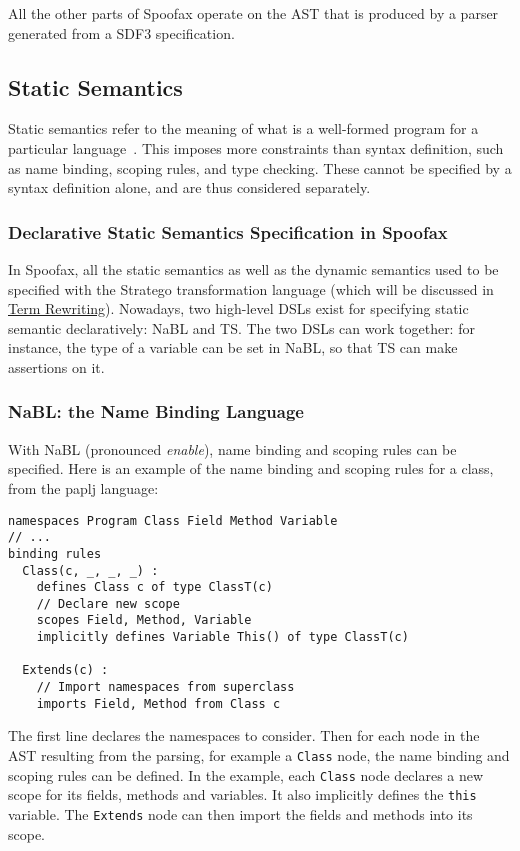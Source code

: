 All the other parts of Spoofax operate on the AST that is produced by
a parser generated from a SDF3 specification.
\subsection{Static Semantics}
\label{sec-static-analysis}
Static semantics refer to the meaning of what is a well-formed program
for a particular language~\cite{Milner97}. This imposes more
constraints than syntax definition, such as name binding, scoping
rules, and type checking. These cannot be specified by a syntax
definition alone, and are thus considered separately.
\subsubsection{Declarative Static Semantics Specification in Spoofax}
\label{sec:orgheadline1}
In Spoofax, all the static semantics as well as the dynamic semantics
used to be specified with the Stratego transformation language (which
will be discussed in \hyperref[sec-term-rewrite]{Term Rewriting}). Nowadays, two high-level DSLs
exist for specifying static semantic declaratively: NaBL and TS. The
two DSLs can work together: for instance, the type of a variable can
be set in NaBL, so that TS can make assertions on it.
\subsubsection{NaBL: the Name Binding Language}
\label{sec:orgheadline2}
With NaBL (pronounced \emph{enable}), name binding and scoping rules can be
specified. Here is an example of the name binding and scoping rules
for a class, from the paplj language:
\begin{verbatim}
namespaces Program Class Field Method Variable
// ...
binding rules
  Class(c, _, _, _) :
    defines Class c of type ClassT(c)
    // Declare new scope
    scopes Field, Method, Variable
    implicitly defines Variable This() of type ClassT(c)

  Extends(c) :
    // Import namespaces from superclass
    imports Field, Method from Class c
\end{verbatim}
The first line declares the namespaces to
consider. Then for each node in the AST resulting from the parsing,
for example a \texttt{Class} node, the name binding and scoping rules can be
defined. In the example, each \texttt{Class} node declares a new scope for
its fields, methods and variables. It also implicitly defines the
\texttt{this} variable. The \texttt{Extends} node can then import the fields and
methods into its scope.

